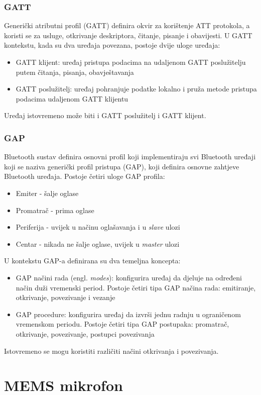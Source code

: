 \subsubsection{GATT}
Generički atributni profil (GATT) definira okvir za korištenje ATT protokola, a koristi se za usluge, otkrivanje deskriptora, čitanje, pisanje i obavijesti. U GATT kontekstu, kada su dva uređaja povezana, postoje dvije uloge uređaja:
\begin{itemize}
	\item GATT klijent: uređaj pristupa podacima na udaljenom GATT poslužitelju putem čitanja, pisanja, obavještavanja 
	\item  GATT poslužitelj: uređaj pohranjuje podatke lokalno i pruža metode pristupa podacima udaljenom GATT klijentu
\end{itemize}

Uređaj istovremeno može biti i GATT poslužitelj i GATT klijent.

\subsubsection{GAP}
Bluetooth sustav definira osnovni profil koji implementiraju svi Bluetooth uređaji koji se naziva generički profil pristupa (GAP), koji definira osnovne zahtjeve Bluetooth uređaja. Postoje četiri uloge GAP profila:
\begin{itemize}
	\item Emiter - šalje oglase
	\item Promatrač - prima oglase
	\item Periferija - uvijek u načinu oglašavanja i u \textit{slave} ulozi 
	\item Centar - nikada ne šalje oglase, uvijek u \textit{master} ulozi
\end{itemize}

U kontekstu GAP-a definirana su dva temeljna koncepta:
\begin{itemize}
	\item GAP načini rada (engl. \textit{modes}): konfigurira uređaj da djeluje na određeni način duži vremenski period. Postoje četiri tipa GAP načina rada: emitiranje, otkrivanje, povezivanje i vezanje
	\item GAP procedure: konfigurira uređaj da izvrši jednu radnju u ograničenom vremenskom periodu. Postoje četiri tipa GAP postupaka: promatrač, otkrivanje, povezivanje, postupci povezivanja
\end{itemize}

Istovremeno se mogu koristiti različiti načini otkrivanja i povezivanja.

\section{MEMS mikrofon}